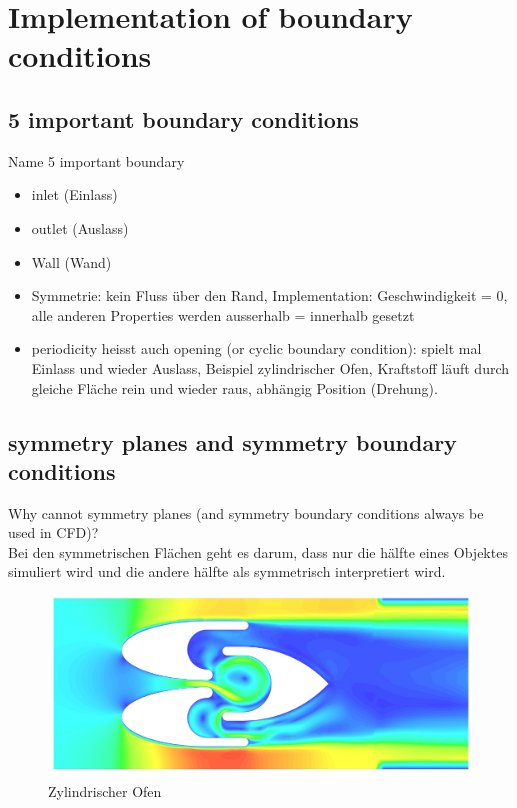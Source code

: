 \documentclass[a4paper]{scrartcl}
\begin{document}
\section{Implementation of boundary conditions}

\subsection{5 important boundary conditions}
Name 5 important boundary\\

\begin{itemize}
  \item inlet (Einlass)
  \item outlet (Auslass)
  \item Wall (Wand)
  \item Symmetrie: kein Fluss über den Rand, Implementation: Geschwindigkeit =
  0, alle anderen Properties werden ausserhalb = innerhalb gesetzt
  \item periodicity heisst auch opening (or cyclic
  boundary condition): spielt mal Einlass und wieder Auslass, Beispiel zylindrischer
  Ofen, Kraftstoff läuft durch gleiche Fläche rein und wieder raus, abhängig
  Position (Drehung).
\end{itemize}


\subsection{symmetry planes and symmetry boundary conditions}
Why cannot symmetry planes (and symmetry boundary conditions always
be used in CFD)?\\
Bei den symmetrischen Flächen geht es darum, dass nur die hälfte eines Objektes
simuliert wird und die andere hälfte als symmetrisch interpretiert wird.\\


\begin{figure}[h!]
\begin{center}
\includegraphics[scale=0.6]{images/symmetrie.pdf}
\caption{Zylindrischer Ofen}
\label{fig:ofen}
\end{center}
\end{figure}
\end{document}
